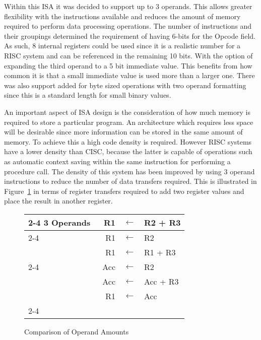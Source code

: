 Within this ISA it was decided to support up to 3 operands. 
This allows greater flexibility with the instructions available and reduces the amount of memory required to perform data processing operations. 
The number of instructions and their groupings determined the requirement of having 6-bits for the Opcode field. 
As such, 8 internal registers could be used since it is a realistic number for a RISC system and can be referenced in the remaining 10 bits. 
With the option of expanding the third operand to a 5 bit immediate value. 
This benefits from how common it is that a small immediate value is used more than a larger one. 
There was also support added for byte sized operations with two operand formatting since this is a standard length for small binary values. 

An important aspect of ISA design is the consideration of how much memory is required to store a particular program. 
An architecture which requires less space will be desirable since more information can be stored in the same amount of memory. 
To achieve this a high code density is required. 
However RISC systems have a lower density than CISC, because the latter is capable of operations such as automatic context saving within the same instruction for performing a procedure call. 
The density of this system has been improved by using 3 operand instructions to reduce the number of data transfers required. 
This is illustrated in Figure~\ref{fig:NoOperands} in terms of register transfers required to add two register values and place the result in another register. 
\begin{figure}[h]
\setlength{\tabcolsep}{2pt}
\centering
\footnotesize
\begin{tabular}{l|rcl|}
	\cline{2-4}
	3 Operands & R1 & $\leftarrow$ & R2 + R3 \\
	\cline{2-4}
	\multirow{2}{*}{2 Operands} & R1 & $\leftarrow$ & R2 \\
	 & R1 & $\leftarrow$ & R1 + R3 \\
	\cline{2-4}
	\multirow{3}{*}{1 Operand} & Acc & $\leftarrow$ & R2 \\
	 & ~Acc & $\leftarrow$ & Acc + R3 \hspace{0.5cm} \\
	 & R1 & $\leftarrow$ & Acc \\
	\cline{2-4}
\end{tabular}
\caption{Comparison of Operand Amounts}
\label{fig:NoOperands}
\end{figure}

